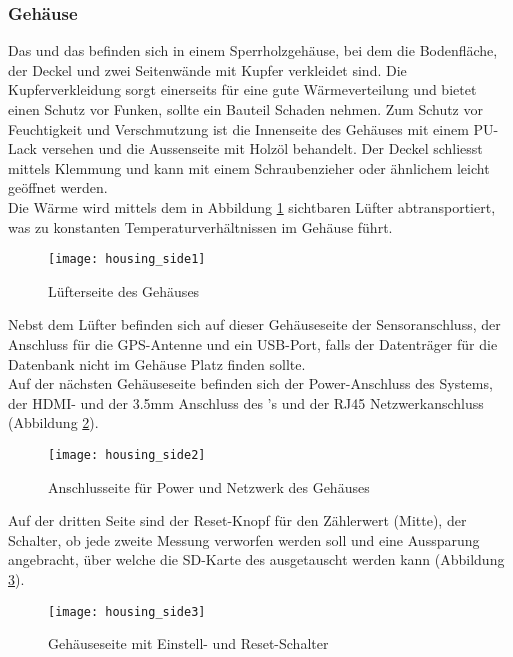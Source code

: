 \subsubsection{Gehäuse}
Das \rpi und das \hwb befinden sich in einem Sperrholzgehäuse, bei dem die Bodenfläche, der Deckel und zwei Seitenwände mit Kupfer verkleidet sind. 
Die Kupferverkleidung sorgt einerseits für eine gute Wärmeverteilung und bietet einen Schutz vor Funken, sollte ein Bauteil Schaden nehmen.
Zum Schutz vor Feuchtigkeit und Verschmutzung ist die Innenseite des Gehäuses mit einem PU-Lack versehen und die Aussenseite mit Holzöl behandelt. 
Der Deckel schliesst mittels Klemmung und kann mit einem Schraubenzieher oder ähnlichem leicht geöffnet werden.\\
Die Wärme wird mittels dem in Abbildung \ref{fig:housing_side1} sichtbaren Lüfter abtransportiert, was zu konstanten Temperaturverhältnissen im Gehäuse führt.
\begin{figure}[H]
	\centering
	\texttt{[image: housing\_side1]}
	\caption{Lüfterseite des Gehäuses}
	\label{fig:housing_side1}
\end{figure}
\noindent Nebst dem Lüfter befinden sich auf dieser Gehäuseseite der Sensoranschluss, der Anschluss für die GPS-Antenne und ein USB-Port, falls der Datenträger für die Datenbank nicht im Gehäuse Platz finden sollte.\\
Auf der nächsten Gehäuseseite befinden sich der Power-Anschluss des Systems, der HDMI- und der 3.5mm Anschluss des \rpi{}'s und der RJ45 Netzwerkanschluss (Abbildung \ref{fig:housing_side2}).
\begin{figure}[H]
	\centering
	\texttt{[image: housing\_side2]}
	\caption{Anschlusseite für Power und Netzwerk des Gehäuses}
	\label{fig:housing_side2}
\end{figure}
Auf der dritten Seite sind der Reset-Knopf für den Zählerwert (Mitte), der Schalter, ob jede zweite Messung verworfen werden soll und eine Aussparung angebracht, über welche die SD-Karte des \rpi ausgetauscht werden kann (Abbildung \ref{fig:housing_side3}).
\begin{figure}[H]
	\centering
	\texttt{[image: housing\_side3]}
	\caption{Gehäuseseite mit Einstell- und Reset-Schalter}
	\label{fig:housing_side3}
\end{figure}